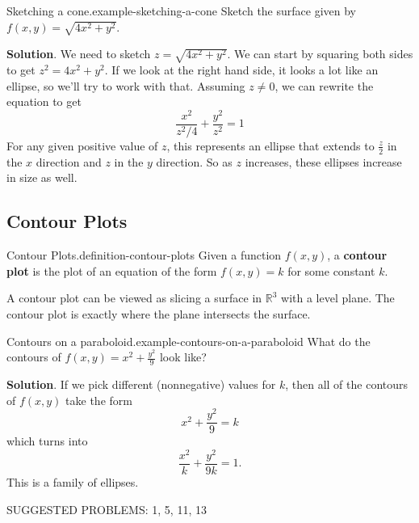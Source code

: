 \documentclass[10pt,]{book}
\newcommand{\terminology}[1]{\textbf{#1}}
\numberwithin{equation}{section}
\newcommand{\RR}{\mathbb{R}}
\begin{document}
\begin{example}{Sketching a cone.}{example-sketching-a-cone}%
\hypertarget{p-1333}{}%
Sketch the surface given by \(f(x,y) = \sqrt{4x^{2} + y^{2}}\).%
\par\smallskip%
\noindent\textbf{Solution}.\hypertarget{solution-212}{}\quad%
\hypertarget{p-1334}{}%
We need to sketch \(z = \sqrt{4x^{2} + y^{2}}\). We can start by squaring both sides to get \(z^{2} = 4x^{2} + y^{2}\). If we look at the right hand side, it looks a lot like an ellipse, so we'll try to work with that. Assuming \(z\neq0\), we can rewrite the equation to get%
\begin{equation*}
\frac{x^{2}}{z^{2}/4} + \frac{y^{2}}{z^{2}} = 1
\end{equation*}
For any given positive value of \(z\), this represents an ellipse that extends to \(\frac{z}{2}\) in the \(x\) direction and \(z\) in the \(y\) direction. So as \(z\) increases, these ellipses increase in size as well.%
\end{example}
%
%
\typeout{************************************************}
\typeout{************************************************}
%
\subsection[{Contour Plots}]{Contour Plots}\label{subsection-contour-plots}
\begin{definition}{Contour Plots.}{definition-contour-plots}%
\hypertarget{p-1335}{}%
Given a function \(f(x,y)\), a \terminology{contour plot} is the plot of an equation of the form \(f(x,y) = k\) for some constant \(k\).%
\end{definition}
\hypertarget{p-1336}{}%
A contour plot can be viewed as slicing a surface in \(\RR^{3}\) with a level plane. The contour plot is exactly where the plane intersects the surface.%
\begin{example}{Contours on a paraboloid.}{example-contours-on-a-paraboloid}%
\hypertarget{p-1337}{}%
What do the contours of \(f(x,y) = x^{2} + \frac{y^{2}}{9}\) look like?%
\par\smallskip%
\noindent\textbf{Solution}.\hypertarget{solution-213}{}\quad%
\hypertarget{p-1338}{}%
If we pick different (nonnegative) values for \(k\), then all of the contours of \(f(x,y)\) take the form%
\begin{equation*}
x^{2} + \frac{y^{2}}{9} = k
\end{equation*}
which turns into%
\begin{equation*}
\frac{x^{2}}{k} + \frac{y^{2}}{{9k}} = 1.
\end{equation*}
This is a family of ellipses.%
\end{example}
\hypertarget{p-1339}{}%
SUGGESTED PROBLEMS: 1, 5, 11, 13%
%
%
\typeout{************************************************}
\typeout{************************************************}
%
\end{document}
